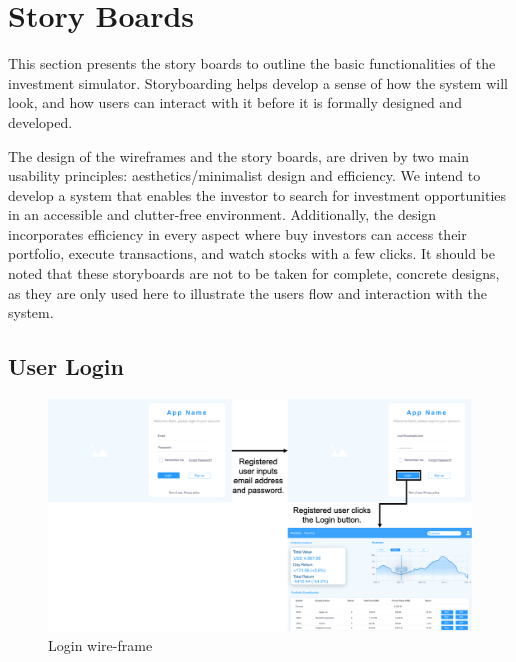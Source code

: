 
\section{Story Boards}
    \label{sec:story_boards}

This section presents the story boards to outline the basic functionalities of the investment simulator. Storyboarding helps develop a sense of how the system will look, and how users can interact with it before it is formally designed and developed. 

The design of the wireframes and the story boards, are driven by two main usability principles: aesthetics/minimalist design and efficiency. We intend to develop a system that enables the investor to search for investment opportunities in an accessible and clutter-free environment. Additionally, the design incorporates efficiency in every aspect where buy investors can access their portfolio, execute transactions, and watch stocks with a few clicks. It should be noted that these storyboards are not to be taken for complete, concrete designs, as they are only used here to illustrate the users flow and interaction with the system.

\subsection{User Login}
\begin{figure}[h]
    \centering
    \includegraphics[scale = 0.5]{./3_story_boards/Login.png}
    \caption{Login wire-frame}
    \label{fig:login}
\end{figure}
\break


